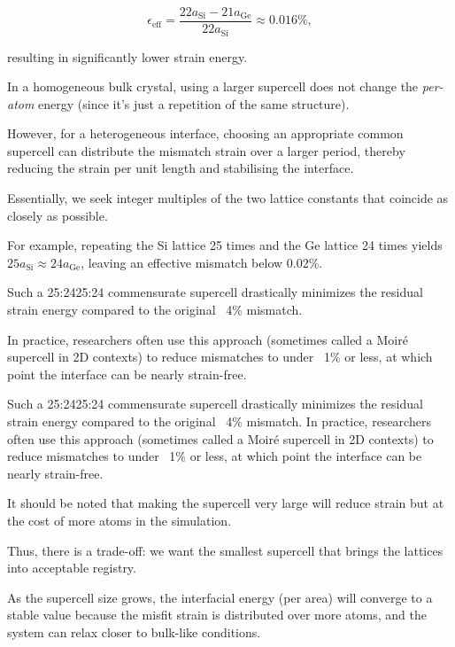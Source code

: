 
\[
\epsilon_{\text{eff}} = \frac{22a_{\mathrm{Si}} - 21a_{\mathrm{Ge}}}{22a_{\mathrm{Si}}} \approx 0.016\%,
\]


resulting in significantly lower strain energy\cite{raffle_paper}.


In a homogeneous bulk crystal, using a larger supercell does not change the \textit{per-atom} energy (since it's just a
repetition of the same structure).

However, for a heterogeneous interface, choosing an appropriate common supercell can distribute the mismatch strain over
a larger period, thereby reducing the strain per unit length and stabilising the interface.

Essentially, we seek integer multiples of the two lattice constants that coincide as closely as possible.

For example, repeating the Si lattice 25 times and the Ge lattice 24 times yields
$25a_{\mathrm{Si}}\approx 24a_{\mathrm{Ge}}$, leaving an effective mismatch below 0.02\%.

Such a 25:2425{:}24 commensurate supercell drastically minimizes the residual strain energy compared to the original
~4\% mismatch.

In practice, researchers often use this approach (sometimes called a Moiré supercell in 2D contexts) to reduce
mismatches to under ~1\% or less, at which point the interface can be nearly strain-free.

Such a 25:2425{:}24 commensurate supercell drastically minimizes the residual strain energy compared to the original
~4\% mismatch. In practice, researchers often use this approach (sometimes called a Moiré supercell in 2D contexts) to
reduce mismatches to under ~1\% or less, at which point the interface can be nearly strain-free.


It should be noted that making the supercell very large will reduce strain but at the cost of more atoms in the
simulation.

Thus, there is a trade-off: we want the smallest supercell that brings the lattices into acceptable registry.

As the supercell size grows, the interfacial energy (per area) will converge to a stable value because the misfit strain
is distributed over more atoms, and the system can relax closer to bulk-like conditions.

